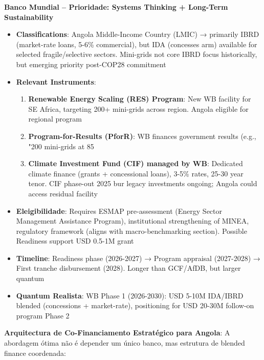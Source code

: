 \documentclass[12pt, a4paper]{article}
\begin{document}
\textbf{Banco Mundial – Prioridade: Systems Thinking + Long-Term Sustainability}
\begin{itemize}
\item \textbf{Classifications}: Angola Middle-Income Country (LMIC) → primarily IBRD (market-rate loans, 5-6\% commercial), but IDA (concesses arm) available for selected fragile/selective sectors. Mini-grids not core IBRD focus historically, but emerging priority post-COP28 commitment
\item \textbf{Relevant Instruments}:
  \begin{enumerate}
  \item \textbf{Renewable Energy Scaling (RES) Program}: New WB facility for SE Africa, targeting 200+ mini-grids across region. Angola eligible for regional program
  \item \textbf{Program-for-Results (PforR)}: WB finances government results (e.g., "200 mini-grids at 85%
  \item \textbf{Climate Investment Fund (CIF) managed by WB}: Dedicated climate finance (grants + concessional loans), 3-5\% rates, 25-30 year tenor. CIF phase-out 2025 bur legacy investments ongoing; Angola could access residual facility
  \end{enumerate}
\item \textbf{Eleigibilidade}: Requires ESMAP pre-assessment (Energy Sector Management Assistance Program), institutional strengthening of MINEA, regulatory framework (aligns with macro-benchmarking section). Possible Readiness support USD 0.5-1M grant
\item \textbf{Timeline}: Readiness phase (2026-2027) → Program appraisal (2027-2028) → First tranche disbursement (2028). Longer than GCF/AfDB, but larger quantum
\item \textbf{Quantum Realista}: WB Phase 1 (2026-2030): USD 5-10M IDA/IBRD blended (concessions + market-rate), positioning for USD 20-30M follow-on program Phase 2
\end{itemize}

\textbf{Arquitectura de Co-Financiamento Estratégico para Angola}: A abordagem ótima não é depender um único banco, mas estrutura de blended finance coordenada:
\end{document}

